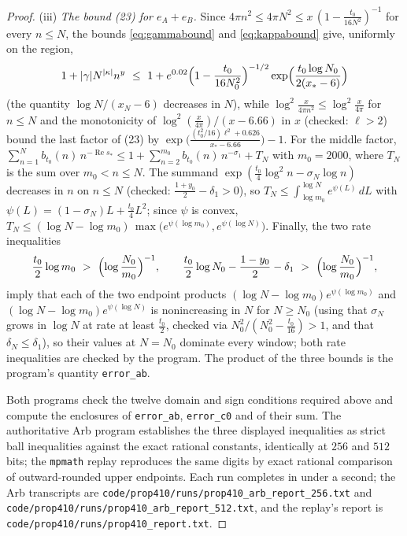 \documentclass[11pt]{article}
\theoremstyle{definition}
\DeclareMathOperator{\Rea}{Re}
\begin{document}
\begin{proof}
(iii) \emph{The bound (23) for $e_A+e_B$.} Since
$4\pi n^2\le4\pi N^2\le x\,(1-\frac{t_0}{16N^2})^{-1}$ for every
$n\le N$, the bounds \eqref{eq:gammabound} and \eqref{eq:kappabound}
give, uniformly on the region,
\[
1+|\gamma|N^{|\kappa|}n^y\ \le\
1+e^{0.02}\Bigl(1-\frac{t_0}{16N_0^2}\Bigr)^{-1/2}
\exp\Bigl(\frac{t_0\log N_0}{2(x_*-6)}\Bigr)
\]
(the quantity $\log N/(x_N-6)$ decreases in $N$), while
$\log^2\frac{x}{4\pi n^2}\le\log^2\frac x{4\pi}$ for $n\le N$ and
the monotonicity of $\log^2(\frac x{4\pi})/(x-6.66)$ in $x$
(checked: $\ell>2$) bound the last factor of (23) by
$\exp\bigl(\frac{(t_0^2/16)\ell^2+0.626}{x_*-6.66}\bigr)-1$. For
the middle factor, $\sum_{n=1}^{N}b_{t_0}(n)\,n^{-\Rea s_*}\le
1+\sum_{n=2}^{m_0}b_{t_0}(n)\,n^{-\sigma_1}+T_N$ with $m_0=2000$,
where $T_N$ is the sum over $m_0<n\le N$. The summand
$\exp(\frac{t_0}4\log^2n-\sigma_N\log n)$ decreases in $n$ on
$n\le N$ (checked: $\frac{1+y_0}2-\delta_1>0$), so
$T_N\le\int_{\log m_0}^{\log N}e^{\psi(L)}\,dL$ with
$\psi(L)=(1-\sigma_N)L+\frac{t_0}4L^2$; since $\psi$ is convex,
$T_N\le(\log N-\log m_0)\,
\max\bigl(e^{\psi(\log m_0)},e^{\psi(\log N)}\bigr)$. Finally, the
two rate inequalities
\[
\frac{t_0}2\log m_0\ >\ \Bigl(\log\frac{N_0}{m_0}\Bigr)^{-1},
\qquad
\frac{t_0}2\log N_0-\frac{1-y_0}2-\delta_1\ >\
\Bigl(\log\frac{N_0}{m_0}\Bigr)^{-1},
\]
imply that each of the two endpoint products
$(\log N-\log m_0)e^{\psi(\log m_0)}$ and
$(\log N-\log m_0)e^{\psi(\log N)}$ is nonincreasing in $N$ for
$N\ge N_0$ (using that $\sigma_N$ grows in $\log N$ at rate at
least $\frac{t_0}2$, checked via $N_0^2/(N_0^2-\frac{t_0}{16})>1$,
and that $\delta_N\le\delta_1$), so their values at $N=N_0$
dominate every window; both rate inequalities are checked by the
program. The product of the three bounds is the
program's quantity \texttt{error\_ab}.

Both programs check the twelve domain and sign conditions
required above and compute the enclosures of
\texttt{error\_ab}, \texttt{error\_c0} and of their sum.  The
authoritative Arb program establishes the three displayed
inequalities as strict ball inequalities against the exact
rational constants, identically at $256$ and $512$ bits; the
\texttt{mpmath} replay reproduces the same digits by exact
rational comparison of outward-rounded upper endpoints.  Each run
completes in under a second; the Arb transcripts are
\texttt{code/prop410/runs/prop410\_arb\_report\_256.txt} and
\texttt{code/prop410/runs/prop410\_arb\_report\_512.txt}, and the
replay's report is
\texttt{code/prop410/runs/prop410\_report.txt}.
\end{proof}
\end{document}
